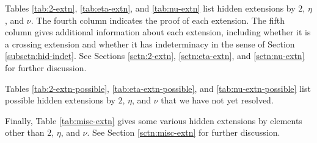 Tables \ref{tab:2-extn}, \ref{tab:eta-extn}, and \ref{tab:nu-extn}
list hidden extensions by $2$, $\eta$, and $\nu$.  
The fourth column indicates the proof of each extension.
The fifth column gives additional information about each extension,
including whether it is a crossing extension and whether it
has indeterminacy in the sense of Section \ref{subsctn:hid-indet}.
See Sections \ref{sctn:2-extn}, \ref{sctn:eta-extn}, and \ref{sctn:nu-extn}
for further discussion.

Tables \ref{tab:2-extn-possible}, \ref{tab:eta-extn-possible}, 
and \ref{tab:nu-extn-possible} list possible hidden extensions
by $2$, $\eta$, and $\nu$ that we have not yet resolved.

Finally, Table \ref{tab:misc-extn} gives some various hidden
extensions by elements other than $2$, $\eta$, and $\nu$.
See Section \ref{sctn:misc-extn} for further discussion.

\newpage

